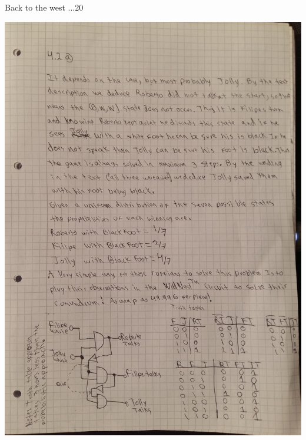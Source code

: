 \newif\ifvimbug
\vimbugfalse

\ifvimbug

	\fi
{}

\begin{questions}
	
\begin{question}{Back to the west ...}{20}

\begin{answer}
	
	
	\includegraphics[scale=0.2]{p1.jpg}
	\newpage

\end{answer}
\end{question}
\end{questions}

